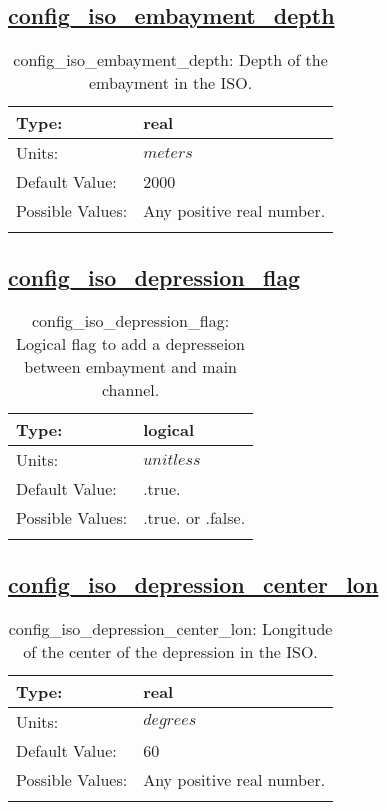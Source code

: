 \subsection[config\_iso\_embayment\_depth]{\hyperref[sec:nm_tab_iso]{config\_iso\_embayment\_depth}}
\label{subsec:nm_sec_config_iso_embayment_depth}
\begin{center}
\begin{longtable}{| p{2.0in} || p{4.0in} |}
    \hline
    Type: & real \\
    \hline
    Units: & $meters$ \\
    \hline
    Default Value: & 2000 \\
    \hline
    Possible Values: & Any positive real number. \\
    \hline
    \caption{config\_iso\_embayment\_depth: Depth of the embayment in the ISO.}
\end{longtable}
\end{center}
\subsection[config\_iso\_depression\_flag]{\hyperref[sec:nm_tab_iso]{config\_iso\_depression\_flag}}
\label{subsec:nm_sec_config_iso_depression_flag}
\begin{center}
\begin{longtable}{| p{2.0in} || p{4.0in} |}
    \hline
    Type: & logical \\
    \hline
    Units: & $unitless$ \\
    \hline
    Default Value: & .true. \\
    \hline
    Possible Values: & .true. or .false. \\
    \hline
    \caption{config\_iso\_depression\_flag: Logical flag to add a depresseion between embayment and main channel.}
\end{longtable}
\end{center}
\subsection[config\_iso\_depression\_center\_lon]{\hyperref[sec:nm_tab_iso]{config\_iso\_depression\_center\_lon}}
\label{subsec:nm_sec_config_iso_depression_center_lon}
\begin{center}
\begin{longtable}{| p{2.0in} || p{4.0in} |}
    \hline
    Type: & real \\
    \hline
    Units: & $degrees$ \\
    \hline
    Default Value: & 60 \\
    \hline
    Possible Values: & Any positive real number. \\
    \hline
    \caption{config\_iso\_depression\_center\_lon: Longitude of the center of the depression in the ISO.}
\end{longtable}
\end{center}
